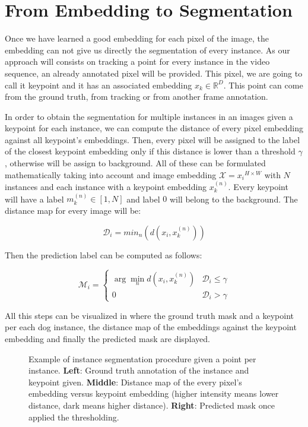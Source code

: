 
\section{From Embedding to Segmentation}
\label{sec:methods:embeddingsegmentation}

Once we have learned a good embedding for each pixel of the image, the embedding can not give us directly the segmentation of every instance.
As our approach will consists on tracking a point for every instance in the video sequence, an already annotated pixel will be provided.
This pixel, we are going to call it keypoint and it has an associated embedding $x_k \in \mathbb{R}^D$.
This point can come from the ground truth, from tracking or from another frame annotation.

In order to obtain the segmentation for multiple instances in an images given a keypoint for each instance, we can compute the distance of every pixel embedding against all keypoint's embeddings.
Then, every pixel will be assigned to the label of the closest keypoint embedding only if this distance is lower than a threshold $\gamma$, otherwise will be assign to background.
All of these can be formulated mathematically taking into account and image embedding $\mathcal{X} = {x_i}^{H \times W}$ with $N$ instances and each instance with a keypoint embedding $x_k^{(n)}$.
Every keypoint will have a label $m_k^{(n)} \in [1, N]$ and label $0$ will belong to the background.
The distance map for every image will be:

\begin{equation}
  \mathcal{D}_i = min_n \left( d(x_i, x_k^{(n)}) \right)
\end{equation}

Then the prediction label can be computed as follows:

\begin{equation}
  \mathcal{M}_i = \begin{cases}
      \arg\min_n d(x_i, x_k^{(n)}) & \mathcal{D}_i \leq \gamma \\
      0 & \mathcal{D}_i > \gamma
   \end{cases}
\end{equation}

All this steps can be visualized in  where the ground truth mask and a keypoint per each dog instance, the distance map of the embeddings against the keypoint embedding and finally the predicted mask are displayed.

\begin{figure}[h]
  \centering
  \caption{Example of instance segmentation procedure given a point per instance.
  \textbf{Left}: Ground truth annotation of the instance and keypoint given.
  \textbf{Middle}: Distance map of the every pixel's embedding versus keypoint embedding (higher intensity means lower distance, dark means higher distance).
  \textbf{Right}: Predicted mask once applied the thresholding. }
  \label{fig:instance_segmentation}
\end{figure}

